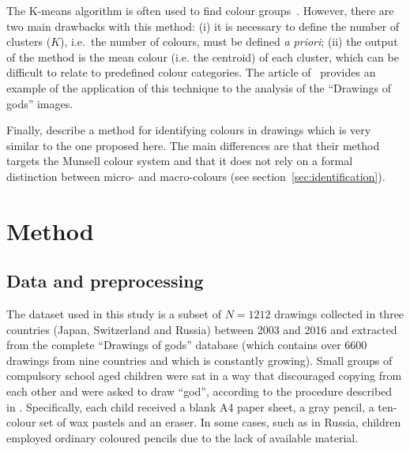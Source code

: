 \documentclass[11pt,a4paper]{article}
\begin{document}
The K-means algorithm is often used to find colour groups~\cite[see e.g.][]{yendrikhovskij2001,konyushkova2015,hulee2007}. However, there are two main drawbacks with this method: (i) it is necessary to define the number of clusters ($K$), i.e.~the number of colours, must be defined \textit{a priori}; (ii) the output of the method is the mean colour (i.e. the centroid) of each cluster, which can be difficult to relate to predefined colour categories. The article of~\citet{konyushkova2015} provides an example of the application of this technique to the analysis of the ``Drawings of gods'' images.

Finally, \citet{kimbaelee2007} describe a method for identifying colours in drawings which is very similar to the one proposed here. The main differences are that their method targets the Munsell colour system \cite{Munsell1912} and that it does not rely on a formal distinction between micro- and macro-colours (see section~\ref{sec:identification}).


\section{Method}\label{methods}
\label{sec:method}

\subsection{Data and preprocessing}
\label{sec:dataset_preprocessing}

The dataset used in this study is a subset of $N = 1212$ drawings collected in three countries (Japan, Switzerland and Russia) between 2003 and 2016 and extracted from the complete ``Drawings of gods'' database (which contains over 6600 drawings from nine countries and which is constantly growing). Small groups of compulsory school aged children were sat in a way that discouraged copying from each other and were asked to draw ``god'', according to the procedure described in \citet{DandarovaRobertDessartSerbaevaEtAl2016}. Specifically, each child received a blank A4 paper sheet, a gray pencil, a ten-colour set of wax pastels and an eraser. In some cases, such as in Russia, children employed ordinary coloured pencils due to the lack of available material.
\end{document}
